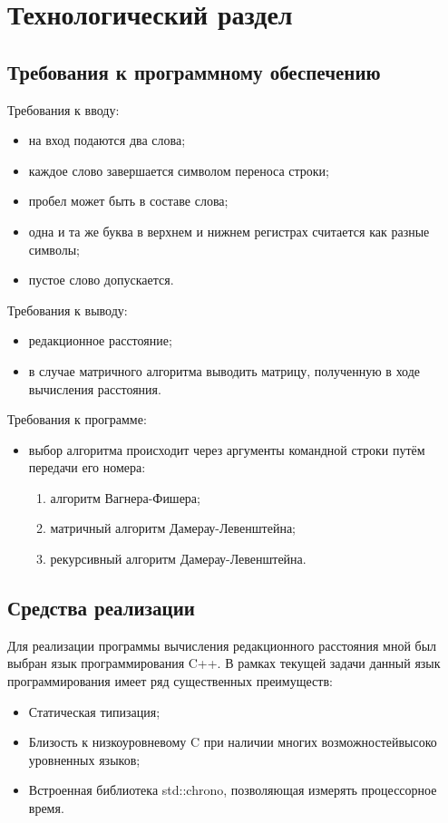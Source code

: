 \chapter{Технологический раздел}
\label{cha:impl}

\section{Требования к программному обеспечению}
Требования к вводу:
\begin{itemize}
    \item на вход подаются два слова;
    \item каждое слово завершается символом переноса строки;
    \item пробел может быть в составе слова;
    \item одна и та же буква в верхнем и нижнем регистрах считается как разные символы;
    \item пустое слово допускается.
\end{itemize}
Требования к выводу:
\begin{itemize}
    \item редакционное расстояние;
    \item в случае матричного алгоритма выводить матрицу, полученную в ходе вычисления расстояния.
\end{itemize}
Требования к программе:
\begin{itemize}
    \item выбор алгоритма происходит через аргументы командной строки путём передачи его номера:
        \begin{enumerate}[1)]
            \item алгоритм Вагнера-Фишера;
            \item матричный алгоритм Дамерау-Левенштейна;
            \item рекурсивный алгоритм Дамерау-Левенштейна.
        \end{enumerate}

\end{itemize}

\section{Средства реализации}
Для реализации программы вычисления редакционного расстояния мной был выбран язык программирования C++. В рамках текущей задачи данный язык программирования имеет ряд существенных преимуществ:
\begin{itemize}
    \item Статическая типизация;
    \item Близость к низкоуровневому C при наличии многих возможностейвысоко уровненных языков;
    \item Встроенная библиотека std::chrono, позволяющая измерять процессорное время.
\end{itemize}


